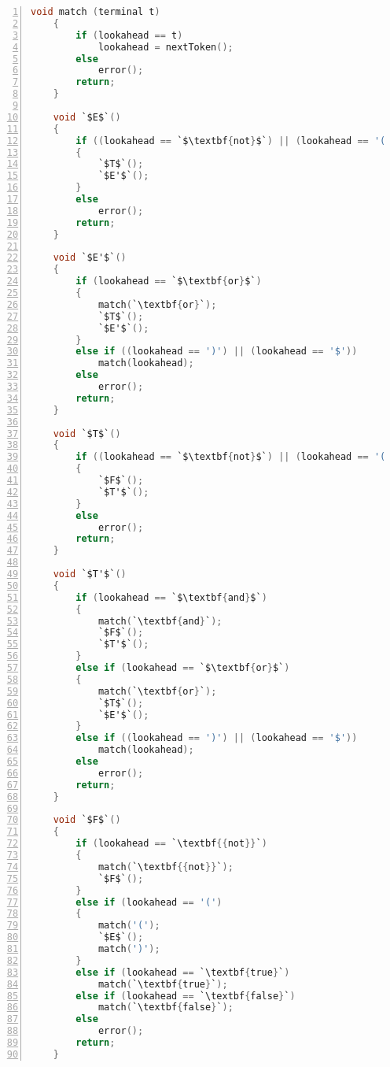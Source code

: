 \documentclass{article}
\begin{document}
\begin{lstlisting}[language = C,
    numbers=left,
    numberstyle=\small,
    keywordstyle=\bfseries\color{blue!70},
    commentstyle=\color{red!40!green!60!blue},
    frame=shadowbox,
    rulesepcolor=\color{red!20!green!30!blue!20},
    basicstyle=\ttfamily,
    breaklines,
    escapeinside=``]
    void match (terminal t)
    {
        if (lookahead == t)
            lookahead = nextToken();
        else
            error();
        return;
    }

    void `$E$`()
    {
        if ((lookahead == `$\textbf{not}$`) || (lookahead == '(') || (lookahead == `$\textbf{true}$`) || (lookahead == `$\textbf{false}$`))
        {
            `$T$`();
            `$E'$`();
        }
        else
            error();
        return;
    }

    void `$E'$`()
    {
        if (lookahead == `$\textbf{or}$`)
        {
            match(`\textbf{or}`);
            `$T$`();
            `$E'$`();
        }
        else if ((lookahead == ')') || (lookahead == '$'))
            match(lookahead);
        else
            error();
        return;
    }

    void `$T$`()
    {
        if ((lookahead == `$\textbf{not}$`) || (lookahead == '(') || (lookahead == `$\textbf{true}$`) || (lookahead == `$\textbf{false}$`))
        {
            `$F$`();
            `$T'$`();
        }
        else
            error();
        return;
    }

    void `$T'$`()
    {
        if (lookahead == `$\textbf{and}$`)
        {
            match(`\textbf{and}`);
            `$F$`();
            `$T'$`();
        }
        else if (lookahead == `$\textbf{or}$`)
        {
            match(`\textbf{or}`);
            `$T$`();
            `$E'$`();
        }
        else if ((lookahead == ')') || (lookahead == '$'))
            match(lookahead);
        else
            error();
        return;
    }

    void `$F$`()
    {
        if (lookahead == `\textbf{{not}}`)
        {
            match(`\textbf{{not}}`);
            `$F$`();
        }
        else if (lookahead == '(')
        {
            match('(');
            `$E$`();
            match(')');
        }
        else if (lookahead == `\textbf{true}`)
            match(`\textbf{true}`);
        else if (lookahead == `\textbf{false}`)
            match(`\textbf{false}`);
        else
            error();
        return;
    }
\end{lstlisting}
\end{document}
